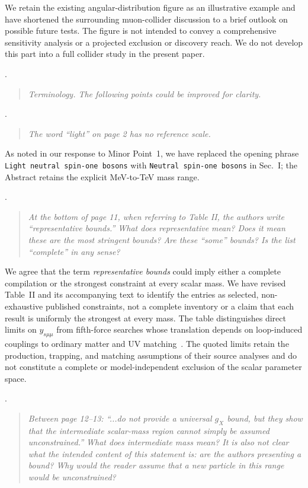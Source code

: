 \documentclass[12pt,a4paper]{article}
\begin{document}
We retain the existing angular-distribution figure as an illustrative example and have shortened the surrounding muon-collider discussion to a brief outlook on possible future tests. The figure is not intended to convey a comprehensive sensitivity analysis or a projected exclusion or discovery reach. We do not develop this part into a full collider study in the present paper.

\medskip
{}. \begin{quote}\itshape
Terminology. The following points could be improved for clarity.
\end{quote}

\medskip
{}. \begin{quote}\itshape
The word ``light'' on page 2 has no reference scale.
\end{quote}

As noted in our response to Minor Point~1, we have replaced the opening phrase \texttt{Light neutral spin-one bosons} with \texttt{Neutral spin-one bosons} in Sec.~I; the Abstract retains the explicit MeV-to-TeV mass range.

\medskip
{}. \begin{quote}\itshape
At the bottom of page 11, when referring to Table II, the authors write ``representative bounds.'' What does representative mean? Does it mean these are the most stringent bounds? Are these ``some'' bounds? Is the list ``complete'' in any sense?
\end{quote}

We agree that the term \emph{representative bounds} could imply either a complete compilation or the strongest constraint at every scalar mass. We have revised Table~II and its accompanying text to identify the entries as selected, non-exhaustive published constraints, not a complete inventory or a claim that each result is uniformly the strongest at every mass. The table distinguishes direct limits on \(y_{s\mu\mu}\) from fifth-force searches whose translation depends on loop-induced couplings to ordinary matter and UV matching~\cite{Liu:2025zuz,Fiorillo:2026wso,Caputo:2021rux,Hoskins:1985tn,Kapner:2006si,Blakemore:2021zna}. The quoted limits retain the production, trapping, and matching assumptions of their source analyses and do not constitute a complete or model-independent exclusion of the scalar parameter space.

\medskip
{}. \begin{quote}\itshape
Between page 12--13: ``...do not provide a universal \(g_X\) bound, but they show that the intermediate scalar-mass region cannot simply be assumed unconstrained.'' What does intermediate mass mean? It is also not clear what the intended content of this statement is: are the authors presenting a bound? Why would the reader assume that a new particle in this range would be unconstrained?
\end{quote}
\end{document}

